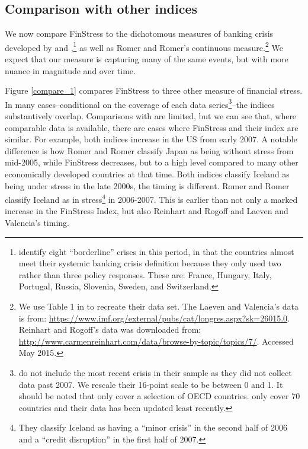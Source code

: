 \documentclass[]{article}
\begin{document}
\subsection{Comparison with other indices}\label{comparison-to-other-crisis-measures}

We now compare FinStress to the dichotomous measures of banking crisis developed by \cite{Reinhart2009} and \cite{laeven2013},\footnote{\cite{laeven2013} identify eight ``borderline'' crises in this period, in that the countries almost meet their systemic banking crisis definition because they only used two rather than three policy responses. These are: France, Hungary, Italy, Portugal, Russia, Slovenia, Sweden, and Switzerland.} as well as Romer and Romer's \citeyearpar{Romer2015} continuous measure.\footnote{We use Table 1 in \cite{Romer2015} to recreate their data set. The Laeven and Valencia's data is from: \url{https://www.imf.org/external/pubs/cat/longres.aspx?sk=26015.0}. Reinhart and Rogoff's data was downloaded from: \url{http://www.carmenreinhart.com/data/browse-by-topic/topics/7/}. Accessed May 2015.} We expect that our measure is capturing many of the same events, but with more nuance in magnitude and over time.

Figure \ref{compare_1} compares FinStress to three other measure of financial stress. In many cases--conditional on the coverage of each data series\footnote{\cite{Romer2015} do not include the most recent crisis in their sample as they did not collect data past 2007. We rescale their 16-point scale to be between 0 and 1. It should be noted that \cite{Romer2015} only cover a selection of OECD countries. \cite{Reinhart2009} only cover 70 countries and their data has been updated least recently.}--the indices substantively overlap. Comparisons with \cite{Romer2015} are limited, but we can see that, where comparable data is available, there are cases where FinStress and their index are similar. For example, both indices increase in the US from early 2007. A notable difference is how Romer and Romer classify Japan as being without stress from mid-2005, while FinStress decreases, but to a high level compared to many other economically developed countries at that time. Both indices classify Iceland as being under stress in the late 2000s, the timing is different. Romer and Romer classify Iceland as in stress\footnote{They classify Iceland as having a ``minor crisis'' in the second half of 2006 and a ``credit  disruption'' in the first half of 2007.} in 2006-2007. This is earlier than not only a marked increase in the FinStress Index, but also Reinhart and Rogoff and Laeven and Valencia's timing.
\end{document}
